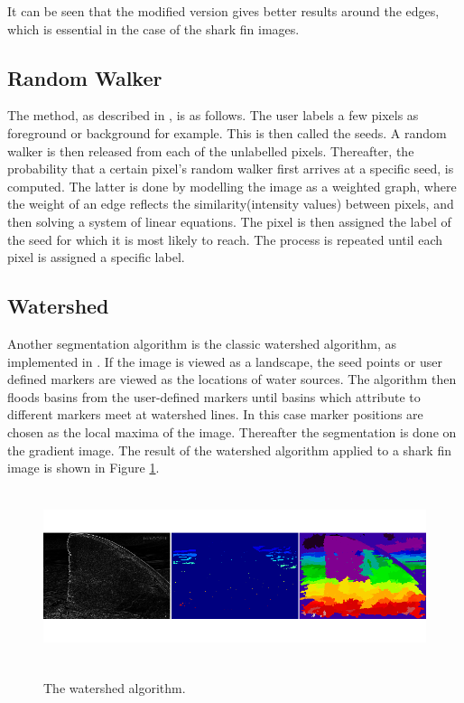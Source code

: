 \documentclass[a4paper,10pt]{article}
\begin{document}
\noindent It can be seen that the modified version gives better results around
the edges, which is essential in the case of the shark fin images. \\  


\subsection{Random Walker}
The method, as
described in \cite{rw}, is as follows.  The user labels a few
pixels as foreground or background for example.  This is then called the seeds. 
A random walker is then released from each of the unlabelled pixels. 
Thereafter, the probability that a certain pixel's random walker first arrives
at a specific seed, is computed.  The latter is done by modelling the image as a weighted graph, where
the weight of an edge reflects the similarity(intensity values) between pixels,
and then solving a system of linear equations.  The pixel is then assigned the
label
of the seed for which it is most likely to reach.  The process is repeated until
each pixel is assigned a specific label.


\subsection{Watershed}
\label{watershed}
Another segmentation algorithm is the classic watershed algorithm, as
implemented in \cite{scikit}.  If the image is viewed
  as a landscape, the seed points or user defined markers are viewed as the locations of water sources.  The algorithm then floods
basins from the user-defined markers until basins which attribute to different
markers meet at watershed lines.  In this case marker positions are chosen as
the local maxima of the image.  Thereafter the segmentation is done on the
gradient image.  The result of the watershed algorithm applied to a shark fin
image is shown in Figure \ref{fig1}.

\begin{figure}[H]
\centering
\includegraphics[width=5in,height=2in]{watershed.png} 
\label{fig1}
\caption{The watershed algorithm. \cite{scikit}}
\end{figure}
\end{document}
